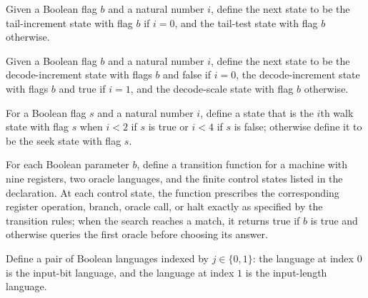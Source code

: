 \begin{definition}
\label{Complexity.dropTailAdvance}
\leanok
{}
Given a Boolean flag $b$ and a natural number $i$, define the next state to be the
tail-increment state with flag $b$ if $i=0$, and the tail-test state with flag $b$
otherwise.
\end{definition}

\begin{definition}
\label{Complexity.dropDecodeAdvance}
\leanok
{}
Given a Boolean flag $b$ and a natural number $i$, define the next state to be the
decode-increment state with flags $b$ and false if $i=0$, the decode-increment state
with flags $b$ and true if $i=1$, and the decode-scale state with flag $b$ otherwise.
\end{definition}

\begin{definition}
\label{Complexity.dropWalk}
\leanok
{}
For a Boolean flag $s$ and a natural number $i$, define a state that is the $i$th walk
state with flag $s$ when $i<2$ if $s$ is true or $i<4$ if $s$ is false; otherwise define
it to be the seek state with flag $s$.
\end{definition}

\begin{definition}
\label{Complexity.dropARM}
\leanok
{}
For each Boolean parameter $b$, define a transition function for a machine with nine
registers, two oracle languages, and the finite control states listed in the
declaration. At each control state, the function prescribes the corresponding register
operation, branch, oracle call, or halt exactly as specified by the transition rules;
when the search reaches a match, it returns true if $b$ is true and otherwise queries
the first oracle before choosing its answer.
\end{definition}

\begin{definition}
\label{Complexity.dropBank}
\leanok
{}
Define a pair of Boolean languages indexed by $j\in\{0,1\}$: the language at index $0$
is the input-bit language, and the language at index $1$ is the input-length language.
\end{definition}

